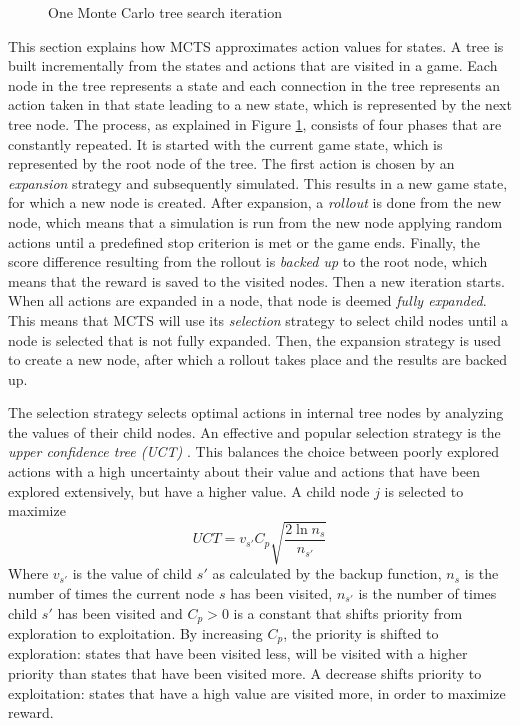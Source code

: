 \begin{figure}
	\centering
	\caption{One Monte Carlo tree search iteration}
	\label{fig:mcts}
\end{figure}

This section explains how MCTS approximates action values for states.  A tree is
built incrementally from the states and actions that are visited in a game. Each
node in the tree represents a state and each connection in the tree represents
an action taken in that state leading to a new state, which is represented by
the next tree node.  The process, as explained in Figure \ref{fig:mcts},
consists of four phases that are constantly repeated. It is started with the
current game state, which is represented by the root node of the tree. The first
action is chosen by an \emph{expansion} strategy and subsequently simulated.
This results in a new game state, for which a new node is created. After
expansion, a \emph{rollout} is done from the new node, which means that a
simulation is run from the new node applying random actions until a predefined
stop criterion is met or the game ends. Finally, the score difference resulting
from the rollout is \emph{backed up} to the root node, which means that the
reward is saved to the visited nodes.  Then a new iteration starts. When all
actions are expanded in a node, that node is deemed \emph{fully expanded}.
This means that MCTS will use its \emph{selection} strategy to select child
nodes until a node is selected that is not fully expanded.  Then, the expansion
strategy is used to create a new node, after which a rollout takes place and the
results are backed up.

The selection strategy selects optimal actions in internal tree nodes by
analyzing the values of their child nodes. An effective and popular
selection strategy is the \emph{upper confidence tree (UCT)}
\cite{kocsis2006bandit}. This balances the choice between poorly explored
actions with a high uncertainty about their value and actions that have been
explored extensively, but have a higher value. A child node $j$ is selected to
maximize
\begin{equation}
	\label{eq:uct}
	UCT = v_{s'} C_p \sqrt{\frac{2 \ln n_s}{n_{s'}}}
\end{equation}
Where $v_{s'}$ is the value of child $s'$ as calculated by the backup function,
$n_s$ is the number of times the current node $s$ has been visited, $n_{s'}$ is
the number of times child $s'$ has been visited and $C_p > 0$ is a constant
that shifts priority from exploration to exploitation. By increasing $C_p$, the
priority is shifted to exploration: states that have been visited less, will be
visited with a higher priority than states that have been visited more. A
decrease shifts priority to exploitation: states that have a high value are
visited more, in order to maximize reward. 

